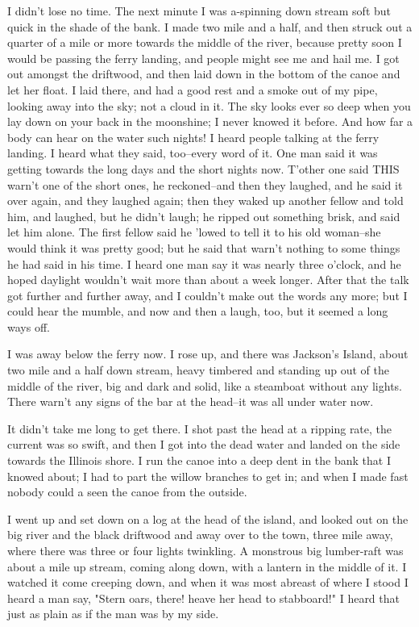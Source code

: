 I didn't lose no time.  The next minute I was a-spinning down stream soft
but quick in the shade of the bank.  I made two mile and a half, and then
struck out a quarter of a mile or more towards the middle of the river,
because pretty soon I would be passing the ferry landing, and people
might see me and hail me.  I got out amongst the driftwood, and then laid
down in the bottom of the canoe and let her float.  I laid there, and had
a good rest and a smoke out of my pipe, looking away into the sky; not a
cloud in it.  The sky looks ever so deep when you lay down on your back
in the moonshine; I never knowed it before.  And how far a body can hear
on the water such nights!  I heard people talking at the ferry landing.
I heard what they said, too--every word of it.  One man said it was
getting towards the long days and the short nights now.  T'other one said
THIS warn't one of the short ones, he reckoned--and then they laughed,
and he said it over again, and they laughed again; then they waked up
another fellow and told him, and laughed, but he didn't laugh; he ripped
out something brisk, and said let him alone.  The first fellow said he
'lowed to tell it to his old woman--she would think it was pretty good;
but he said that warn't nothing to some things he had said in his time.
I heard one man say it was nearly three o'clock, and he hoped daylight
wouldn't wait more than about a week longer.  After that the talk got
further and further away, and I couldn't make out the words any more; but
I could hear the mumble, and now and then a laugh, too, but it seemed a
long ways off.

I was away below the ferry now.  I rose up, and there was Jackson's
Island, about two mile and a half down stream, heavy timbered and
standing up out of the middle of the river, big and dark and solid, like
a steamboat without any lights.  There warn't any signs of the bar at the
head--it was all under water now.

It didn't take me long to get there.  I shot past the head at a ripping
rate, the current was so swift, and then I got into the dead water and
landed on the side towards the Illinois shore.  I run the canoe into a
deep dent in the bank that I knowed about; I had to part the willow
branches to get in; and when I made fast nobody could a seen the canoe
from the outside.

I went up and set down on a log at the head of the island, and looked out
on the big river and the black driftwood and away over to the town, three
mile away, where there was three or four lights twinkling.  A monstrous
big lumber-raft was about a mile up stream, coming along down, with a
lantern in the middle of it.  I watched it come creeping down, and when
it was most abreast of where I stood I heard a man say, "Stern oars,
there! heave her head to stabboard!"  I heard that just as plain as if
the man was by my side.

